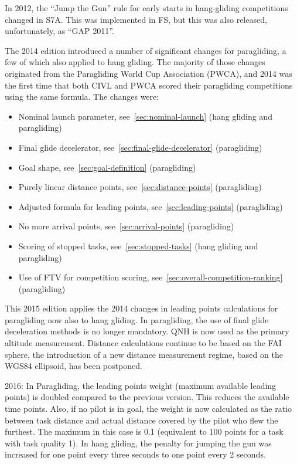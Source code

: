 \documentclass{article}
\begin{document}
In 2012, the “Jump the Gun” rule for early starts in hang-gliding competitions
changed in S7A. This was implemented in FS, but this was also released,
unfortunately, as “GAP 2011”.

The 2014 edition introduced a number of significant changes for paragliding,
a few of which also applied to hang gliding. The majority of those changes
originated from the Paragliding World Cup Association (PWCA), and 2014 was the
first time that both CIVL and PWCA scored their paragliding competitions using
the same formula. The changes were:
\begin{itemize}
    \item
        Nominal launch parameter, see~\ref{sec:nominal-launch} (hang gliding
        and paragliding)
    \item
        Final glide decelerator, see~\ref{sec:final-glide-decelerator}
        (paragliding)
    \item
        Goal shape, see~\ref{sec:goal-definition} (paragliding)
    \item
        Purely linear distance points, see~\ref{sec:distance-points}
        (paragliding)
    \item
        Adjusted formula for leading points, see~\ref{sec:leading-points}
        (paragliding)
    \item
        No more arrival points, see~\ref{sec:arrival-points} (paragliding)
    \item
        Scoring of stopped tasks, see~\ref{sec:stopped-tasks} (hang gliding and
        paragliding)
    \item
        Use of FTV for competition scoring,
        see~\ref{sec:overall-competition-ranking} (paragliding)
\end{itemize}
This 2015 edition applies the 2014 changes in leading points calculations for
paragliding now also to hang gliding. In paragliding, the use of final glide
deceleration methods is no longer mandatory. QNH is now used as the primary
altitude measurement. Distance calculations continue to be based on the FAI
sphere, the introduction of a new distance measurement regime, based on the
WGS84 ellipsoid, has been postponed.

2016: In Paragliding, the leading points weight (maximum available leading
points) is doubled compared to the previous version. This reduces the available
time points. Also, if no pilot is in goal, the weight is now calculated as the
ratio between task distance and actual distance covered by the pilot who flew
the furthest. The maximum in this case is 0.1 (equivalent to 100 points for
a task with task quality 1). In hang gliding, the penalty for jumping the gun
was increased for one point every three seconds to one point every 2 seconds.
\end{document}
